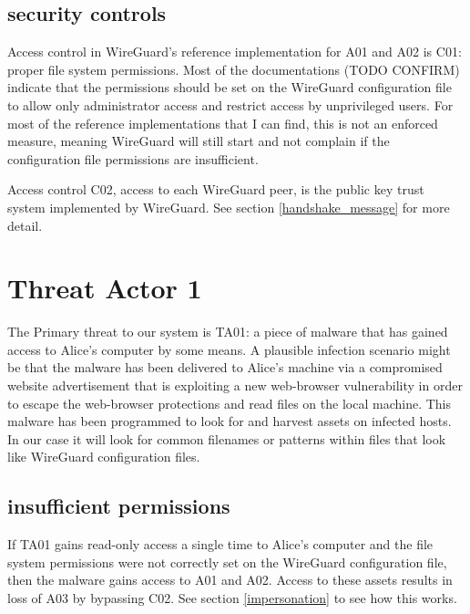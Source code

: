 \documentclass [11pt, proquest] {uwthesis}[2020/02/24]
\begin{document}
\subsection{security controls}
Access control in WireGuard's reference implementation for A01 and A02 is C01: proper file system permissions. Most of the documentations (TODO CONFIRM) indicate that the permissions should be set on the WireGuard configuration file to allow only administrator access and restrict access by unprivileged users. For most of the reference implementations that I can find, this is not an enforced measure, meaning WireGuard will still start and not complain if the configuration file permissions are insufficient. 

Access control C02, access to each WireGuard peer, is the public key trust system implemented by WireGuard. See section \ref{handshake_message} for more detail.

\section{Threat Actor 1}
The Primary threat to our system is TA01: a piece of malware that has gained access to Alice's computer by some means. A plausible infection scenario might be that the malware has been delivered to Alice's machine via a compromised website advertisement that is exploiting a new web-browser vulnerability in order to escape the web-browser protections and read files on the local machine.  This malware has been programmed to look for and harvest assets on infected hosts. In our case it will look for common filenames or patterns within files that look like WireGuard configuration files.  
\subsection{insufficient permissions}
If TA01 gains read-only access a single time to Alice's computer and the file system permissions were not correctly set on the WireGuard configuration file, then the malware gains access to A01 and A02. Access to these assets results in loss of A03 by bypassing C02. See section \ref{impersonation} to see how this works.
\end{document}
